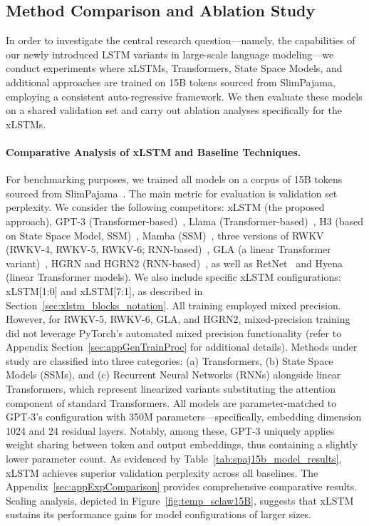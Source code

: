 \subsection{Method Comparison and Ablation Study}
\label{sec:ExpComparison}

In order to investigate the central research question—namely, the capabilities of our newly introduced LSTM variants in large-scale language modeling—we conduct experiments where xLSTMs, Transformers, State Space Models, and additional approaches are trained on 15B tokens sourced from SlimPajama, employing a consistent auto-regressive framework. We then evaluate these models on a shared validation set and carry out ablation analyses specifically for the xLSTMs.

\paragraph{Comparative Analysis of xLSTM and Baseline Techniques.} For benchmarking purposes, we trained all models on a corpus of 15B tokens sourced from SlimPajama~\citep{Soboleva:23}. The main metric for evaluation is validation set perplexity. We consider the following competitors: xLSTM (the proposed approach), GPT-3 (Transformer-based)~\citep{Brown:20short}, Llama (Transformer-based)~\citep{Touvron:23arxiv}, H3 (based on State Space Model, SSM)~\citep{Fu:23}, Mamba (SSM)~\citep{Gu:24arxiv}, three versions of RWKV (RWKV-4, RWKV-5, RWKV-6; RNN-based)~\citep{Peng:23arxivshort,Peng:24arxivshort}, GLA (a linear Transformer variant)~\citep{Yang:23arxiv}, HGRN and HGRN2 (RNN-based)~\citep{Qin:23,Qin:24arxiv}, as well as RetNet~\citep{Sun:23arxiv} and Hyena~\citep{Poli:23} (linear Transformer models). We also include specific xLSTM configurations: xLSTM[1:0] and xLSTM[7:1], as described in Section~\ref{sec:xlstm_blocks_notation}. 
All training employed mixed precision. However, for RWKV-5, RWKV-6, GLA, and HGRN2, mixed-precision training did not leverage PyTorch’s automated mixed precision functionality (refer to Appendix Section~\ref{sec:appGenTrainProc} for additional details).
Methods under study are classified into three categories: (a) Transformers, (b) State Space Models (SSMs), and (c) Recurrent Neural Networks (RNNs) alongside linear Transformers, which represent linearized variants substituting the attention component of standard Transformers. All models are parameter-matched to GPT-3’s configuration with 350M parameters—specifically, embedding dimension 1024 and 24 residual layers. Notably, among these, GPT-3 uniquely applies weight sharing between token and output embeddings, thus containing a slightly lower parameter count. As evidenced by Table~\ref{tab:spaj15b_model_results}, xLSTM achieves superior validation perplexity across all baselines. The Appendix~\ref{sec:appExpComparison} provides comprehensive comparative results.
Scaling analysis, depicted in Figure~\ref{fig:temp_sclaw15B}, suggests that xLSTM sustains its performance gains for model configurations of larger sizes.


